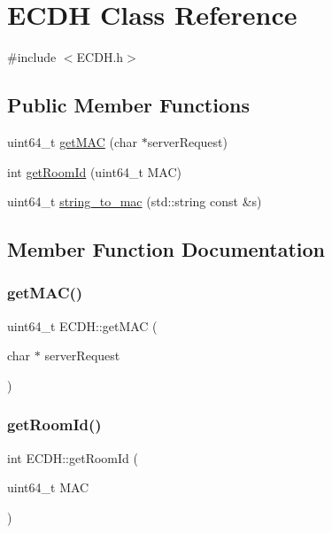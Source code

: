 \hypertarget{classECDH}{}\section{E\+C\+DH Class Reference}
\label{classECDH}


{\ttfamily \#include $<$E\+C\+D\+H.\+h$>$}

\subsection*{Public Member Functions}
\begin{DoxyCompactItemize}
\item 
uint64\+\_\+t \hyperlink{classECDH_a3ff5f397f1198e2f1daa7689434f338c}{get\+M\+AC} (char $\ast$server\+Request)
\item 
int \hyperlink{classECDH_ac552676079ed12da22501ead4d15500b}{get\+Room\+Id} (uint64\+\_\+t M\+AC)
\item 
uint64\+\_\+t \hyperlink{classECDH_a0b5fb1d5817ba51fe4e055190c3c88f2}{string\+\_\+to\+\_\+mac} (std\+::string const \&s)
\end{DoxyCompactItemize}


\subsection{Member Function Documentation}
\mbox{\label{classECDH_a3ff5f397f1198e2f1daa7689434f338c}} 
\subsubsection{\texorpdfstring{get\+M\+A\+C()}{getMAC()}}
{\footnotesize\ttfamily uint64\+\_\+t E\+C\+D\+H\+::get\+M\+AC (\begin{DoxyParamCaption}\item[{char $\ast$}]{server\+Request }\end{DoxyParamCaption})}

\mbox{\label{classECDH_ac552676079ed12da22501ead4d15500b}} 
\subsubsection{\texorpdfstring{get\+Room\+Id()}{getRoomId()}}
{\footnotesize\ttfamily int E\+C\+D\+H\+::get\+Room\+Id (\begin{DoxyParamCaption}\item[{uint64\+\_\+t}]{M\+AC }\end{DoxyParamCaption})}


